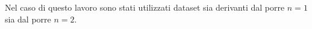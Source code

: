 Nel caso di questo lavoro sono stati utilizzati dataset sia derivanti dal porre $n=1$ sia dal porre $n=2$.







